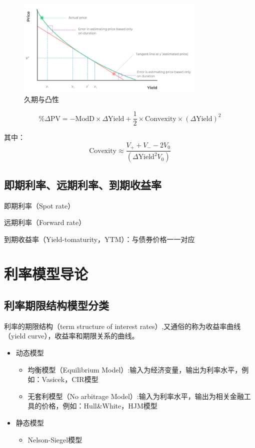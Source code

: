 \documentclass[11pt]{article}
\begin{document}
\begin{figure}[H]
    \centering
    \includegraphics[width=0.8\textwidth]{fig/duration-convexity.png}
    \caption{久期与凸性}
    \label{fig:duration-convexity}
\end{figure}

\begin{equation*}
    \%\Delta\text{PV} = -\text{ModD} \times \Delta\text{Yield} + \frac{1}{2} \times \text{Convexity} \times (\Delta\text{Yield})^2
\end{equation*}

其中：
\begin{equation*}
    \text{Covexity} \approx \frac{V_{+}+V_{-}-2 V_0}{(\Delta\text{Yield}^2 V_0)}
\end{equation*}


\subsection{即期利率、远期利率、到期收益率}

即期利率（Spot rate）

远期利率（Forward rate）

到期收益率（Yield-tomaturity，YTM）：与债券价格一一对应

\section{利率模型导论}

\subsection{利率期限结构模型分类}

利率的期限结构（term structure of interest rates）,又通俗的称为收益率曲线（yield curve），收益率和期限关系的曲线。
\begin{itemize}
    \item 动态模型
    \begin{itemize}
        \item 均衡模型（Equilibrium Model）:输入为经济变量，输出为利率水平，例如：Vasicek，CIR模型
        \item 无套利模型（No arbitrage Model）:输入为利率水平，输出为相关金融工具的价格，例如：Hull\&White，HJM模型
    \end{itemize}
    \item 静态模型
    \begin{itemize}
        \item Nelson-Siegel模型
    \end{itemize}
\end{itemize}
\end{document}
